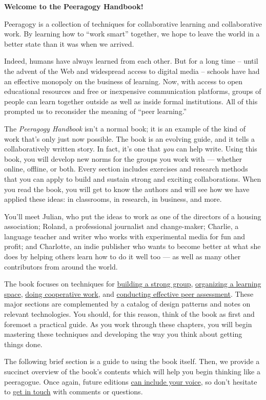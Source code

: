 \textbf{Welcome to the Peeragogy Handbook!}

Peeragogy is a collection of techniques for collaborative learning and
collaborative work. By learning how to ``work smart'' together, we hope
to leave the world in a better state than it was when we arrived.

Indeed, humans have always learned from each other. But for a long time
-- until the advent of the Web and widespread access to digital media --
schools have had an effective monopoly on the business of learning. Now,
with access to open educational resources and free or inexpensive
communication platforms, groups of people can learn together outside as
well as inside formal institutions. All of this prompted us to
reconsider the meaning of ``peer learning.''

The \emph{Peeragogy Handbook} isn't a normal book; it is an example of
the kind of work that's only just now possible. The book is an evolving
guide, and it tells a collaboratively written story. In fact, it's one
that \emph{you} can help write. Using this book, you will develop new
norms for the groups you work with --- whether online, offline, or both.
Every section includes exercises and research methods that you can apply
to build and sustain strong and exciting collaborations. When you read
the book, you will get to know the authors and will see how we have
applied these ideas: in classrooms, in research, in business, and more.

You'll meet Julian, who put the ideas to work as one of the directors of
a housing association; Roland, a professional journalist and
change-maker; Charlie, a language teacher and writer who works with
experimental media for fun and profit; and Charlotte, an indie publisher
who wants to become better at what she does by helping others learn how
to do it well too --- as well as many other contributors from around the
world.

The book focuses on techniques for
\href{http://peeragogy.org/convene/}{building a strong group},
\href{http://peeragogy.org/organize/}{organizing a learning space},
\href{http://peeragogy.org/cowork/}{doing cooperative work}, and
\href{http://peeragogy.org/assessment/}{conducting effective peer
assessment}. These major sections are complemented by a catalog of
design patterns and notes on relevant technologies. You should, for this
reason, think of the book as first and foremost a practical guide. As
you work through these chapters, you will begin mastering these
techniques and developing the way you think about getting things done.

The following brief section is a guide to using the book itself. Then,
we provide a succinct overview of the book's contents which will help
you begin thinking like a peeragogue. Once again, future editions
\href{http://peeragogy.org/resources/how-to-get-involved/}{can include
your voice}, so don't hesitate to
\href{http://peeragogy.org/contact/}{get in touch} with comments or
questions.


